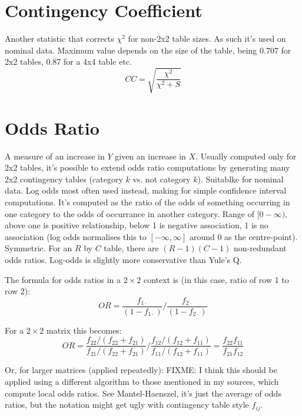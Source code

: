 \documentclass[11pt]{article}
\begin{document}
\section{Contingency Coefficient}
Another statistic that corrects $\chi^2$ for non-2x2 table sizes.  As such it's used on nominal data.  Maximum value depends on the size of the table, being 0.707 for 2x2 tables, 0.87 for a 4x4 table etc.  
$$
CC = \sqrt{ \frac{ \chi^2 }{ \chi^2 + S } }
$$














\section{Odds Ratio}
\label{section:oddsratio}
A measure of an increase in $Y$ given an increase in $X$. %
Usually computed only for 2x2 tables, it's possible to extend odds ratio computations by generating many 2x2 contingency tables (category $k$ vs. not category $k$).  Suitablke for nominal data.  %
Log odds most often used instead, making for simple confidence interval computations.  It's computed as the ratio of the odds of something occurring in one category to the odds of occurrance in another category.  Range of $[0-\infty)$, above one is positive relationship, below 1 is negative association, 1 is no association (log odds normalises this to $[-\infty, \infty]$ around 0 as the centre-point).  Symmetric.  For an $R$ by $C$ table, there are $(R-1)(C-1)$ non-redundant odds ratios.  Log-odds is slightly more conservative than Yule's Q.

The formula for odds ratios in a $2\times 2$ context is (in this case, ratio of row 1 to row 2):
$$
OR = {   \frac{ f_{1\cdot} }{ (1-f_{1\cdot}) }   \bigg /  \frac{ f_{2\cdot} }{ (1-f_{2\cdot}) }        }
$$

For a $2\times 2$ matrix this becomes:
$$
OR = { \dfrac{f_{22}/(f_{22}+f_{21})}{f_{21}/(f_{22}+f_{21})} \bigg / \dfrac{f_{12}/(f_{12}+f_{11})}{f_{11}/(f_{12}+f_{11})}} = \dfrac{f_{22}f_{11}}{f_{21}f_{12}}
$$


Or, for larger matrices (applied repeatedly):
FIXME: I think this should be applied using a different algorithm to those mentioned in my sources, which compute local odds ratios.  
See Mantel-Haenszel, it's just the average of odds ratios, but the notation might get ugly with contingency table style $f_{ij}$.
\end{document}
